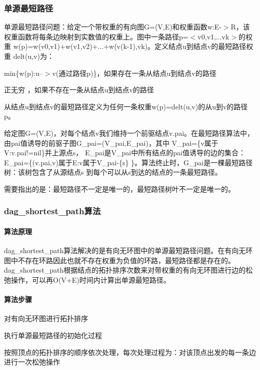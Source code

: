 \subsubsection*{单源最短路径}

单源最短路径问题：给定一个带权重的有向图\+G=(V,E)和权重函数w\+:E-\/$>$R，该权重函数将每条边映射到实数值的权重上。图中一条路径p=$<$v0,v1,...vk$>$的权重 w(p)=w(v0,v1)+w(v1,v2)+...+w(v(k-\/1),vk)。定义结点u到结点v的最短路径权重 delt(u,v)为：


\begin{DoxyItemize}
\item min\{w(p)\+:u--$>$v(通过路径p)\}，如果存在一条从结点u到结点v的路径
\item 正无穷 ，如果不存在一条从结点u到结点v的路径
\end{DoxyItemize}

从结点u到结点v的最短路径定义为任何一条权重w(p)=delt(u,v)的从u到v的路径p。

给定图\+G=(V,E)，对每个结点v我们维持一个前驱结点v.\+pai。在最短路径算法中，由pai值诱导的前驱子图\+G\+\_\+pai=(V\+\_\+pai,E\+\_\+pai)，其中 V\+\_\+pai=\{v属于\+V\+:v.\+pai!=nil\}并上源点s， E\+\_\+pai是\+V\+\_\+pai中所有结点的pai值诱导的边的集合：\+E\+\_\+pai=\{(v.\+pai,v)属于\+E\+:v属于\+V\+\_\+pai-\/\{s\} \}。算法终止时，\+G\+\_\+pai是一棵最短路径树：该树包含了从源结点s 到每个可以从s到达的结点的一条最短路径。

需要指出的是：最短路径不一定是唯一的，最短路径树叶不一定是唯一的。

\subsubsection*{dag\+\_\+shortest\+\_\+path算法}

\paragraph*{算法原理}

dag\+\_\+shortest\+\_\+path算法解决的是有向无环图中的单源最短路径问题。在有向无环图中不存在环路因此也就不存在权重为负值的环路，最短路径都是存在的。 dag\+\_\+shortest\+\_\+path根据结点的拓扑排序次数来对带权重的有向无环图进行边的松弛操作，可以再\+O(V+\+E)时间内计算出单源最短路径。

\paragraph*{算法步骤}


\begin{DoxyItemize}
\item 对有向无环图进行拓扑排序
\item 执行单源最短路径的初始化过程
\item 按照顶点的拓扑排序的顺序依次处理，每次处理过程为：对该顶点出发的每一条边进行一次松弛操作
\end{DoxyItemize}

